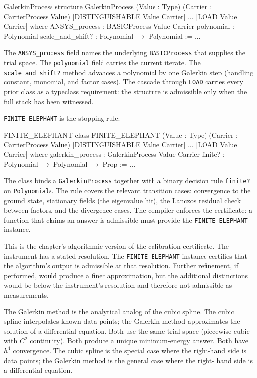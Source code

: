\begin{leanexcerpt}{GalerkinProcess}
structure GalerkinProcess
    (Value : Type)
    (Carrier : CarrierProcess Value)
    [DISTINGUISHABLE Value Carrier] ... [LOAD Value Carrier]
  where
  ANSYS_process    : BASICProcess Value Carrier
  polynomial       : Polynomial
  scale_and_shift? : Polynomial $\to$ Polynomial := ...
\end{leanexcerpt}

The \texttt{ANSYS\_process} field names the underlying
\texttt{BASICProcess} that supplies the trial space. The
\texttt{polynomial} field carries the current iterate. The
\texttt{scale\_and\_shift?} method advances a polynomial by one
Galerkin step (handling constant, monomial, and factor cases). The
cascade through \texttt{LOAD} carries every prior class as a
typeclass requirement: the structure is admissible only when the
full stack has been witnessed.

\texttt{FINITE\_ELEPHANT} is the stopping rule:

\begin{leanexcerpt}{FINITE_ELEPHANT}
class FINITE_ELEPHANT
    (Value : Type)
    (Carrier : CarrierProcess Value)
    [DISTINGUISHABLE Value Carrier] ... [LOAD Value Carrier]
  where
  galerkin_process : GalerkinProcess Value Carrier
  finite?          : Polynomial $\to$ Polynomial $\to$ Prop := ...
\end{leanexcerpt}

The class binds a \texttt{GalerkinProcess} together with a binary
decision rule \texttt{finite?} on \texttt{Polynomial}s. The rule
covers the relevant transition cases: convergence to the ground
state, stationary fields (the eigenvalue hit), the Lanczos residual
check between factors, and the divergence cases. The compiler
enforces the certificate: a function that claims an answer is
admissible must provide the \texttt{FINITE\_ELEPHANT} instance.

This is the chapter's algorithmic version of the calibration
certificate. The instrument has a stated resolution. The
\texttt{FINITE\_ELEPHANT} instance certifies that the algorithm's
output is admissible at that resolution. Further refinement, if
performed, would produce a finer approximation, but the additional
distinctions would be below the instrument's resolution and
therefore not admissible as measurements.

The Galerkin method is the analytical analog of the cubic spline. The
cubic spline interpolates known data points; the Galerkin method
approximates the solution of a differential equation. Both use the
same trial space (piecewise cubic with $C^2$ continuity). Both
produce a unique minimum-energy answer. Both have $h^4$ convergence.
The cubic spline is the special case where the right-hand side is
data points; the Galerkin method is the general case where the right-
hand side is a differential equation.

